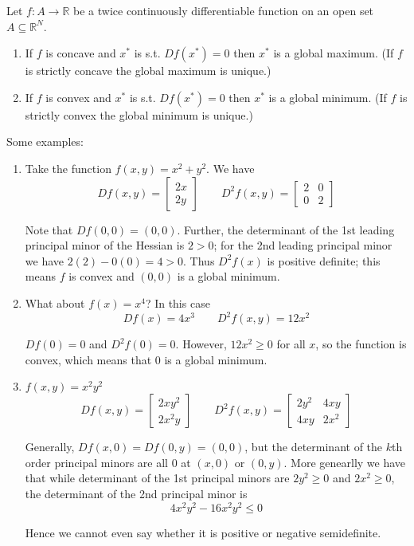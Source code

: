 \documentclass{article}
\begin{document}
\begin{theorem}
  Let $f: A \to \mathbb{R}$ be a twice continuously differentiable function on an open set $A \subseteq \mathbb{R}^N$.
  \begin{enumerate}
    \item If $f$ is concave and $x^*$ is s.t. $Df(x^*) = 0$ then $x^*$ is a global maximum. (If $f$ is strictly concave the global maximum is unique.)

    \item If $f$ is convex and $x^*$ is s.t. $Df(x^*) = 0$ then $x^*$ is a global minimum. (If $f$ is strictly convex the global minimum is unique.)
  \end{enumerate}
\end{theorem}

Some examples:
\begin{enumerate}
  \item Take the function $f(x, y) = x^2 + y^2$. We have
    \[
      Df(x, y) = \left[\begin{matrix}
      2x \\ 2y
      \end{matrix}\right]
      \quad\quad
      D^2f(x, y) = \left[\begin{matrix}
        2 & 0 \\ 0 & 2
      \end{matrix}\right]
    \]

    Note that $Df(0, 0) = (0, 0)$. Further, the determinant of the 1st leading principal minor of the Hessian is $2 > 0$; for the 2nd leading principal minor we have $2(2) - 0(0) = 4 > 0$. Thus $D^2f(x)$ is positive definite; this means $f$ is convex and $(0, 0)$ is a global minimum.

  \item What about $f(x) = x^4$? In this case
    \[
      Df(x) = 4x^3
      \quad\quad
      D^2f(x, y) = 12x^2
    \]

    $Df(0) = 0$ and $D^2f(0) = 0$. However, $12x^2 \ge 0$ for all $x$, so the function is convex, which means that $0$ is a global minimum.

  \item $f(x, y) = x^2y^2$
    \[
      Df(x, y) = \left[\begin{matrix}
      2xy^2 \\ 2x^2y
      \end{matrix}\right]
      \quad\quad
      D^2f(x, y) = \left[\begin{matrix}
        2y^2 & 4xy \\ 4xy & 2x^2
      \end{matrix}\right]
    \]

    Generally, $Df(x, 0) = Df(0, y) = (0, 0)$, but the determinant of the $k$th order principal minors are all $0$ at $(x, 0)$ or $(0, y)$. More genearlly we have that while determinant of the 1st principal minors are $2y^2 \ge 0$ and $2x^2 \ge 0$, the determinant of the 2nd principal minor is
    \[
        4x^2y^2 - 16x^2y^2 \le 0
    \]

    Hence we cannot even say whether it is positive or negative semidefinite.
\end{enumerate}


\clearpage
\printindex

\end{document}
